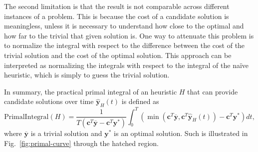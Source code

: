 The second limitation is that the result is not comparable across different instances of a problem.
This is because the cost of a candidate solution is meaningless, unless it is necessary to understand how close to the optimal and how far to the trivial that given solution is.
One way to attenuate this problem is to normalize the integral with respect to the difference between the cost of the trivial solution and the cost of the optimal solution.
This approach can be interpreted as normalizing the integrals with respect to the integral of the naïve heuristic, which is simply to guess the trivial solution.

In summary, the practical primal integral of an heuristic $H$ that can provide candidate solutions over time $\hat{\bm{y}}_H(t)$ is defined as
\begin{equation}\label{eq:primal-integral}
    \text{PrimalIntegral}(H) = \frac{1}{T(\bm{c}^T \overline{\bm{y}} - \bm{c}^T \bm{y}^*)} \int_0^{T} \left( \min\left( \bm{c}^T \overline{\bm{y}}, \bm{c}^{T} \hat{\bm{y}}_H(t) \right)  - \bm{c}^{T} \bm{y}^* \right)  dt
,\end{equation}
where $\overline{\bm{y}}$ is a trivial solution and $\bm{y}^*$ is an optimal solution.
Such is illustrated in Fig.~\ref{fig:primal-curve} through the hatched region.

